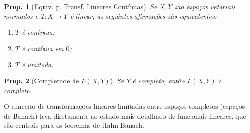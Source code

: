 \documentclass[11pt]{article}
\theoremstyle{yellowhead}
\newtheorem*{proposition}{Prop.}
\theoremstyle{yellowdef}
\begin{document}
\begin{multicols}{3}
\begin{proposition}[Equiv. p. Transf. Lineares Contínuas]
Se $X, Y$ são espaços vetoriais normados e $T: X \to Y$ é linear, as seguintes afirmações são equivalentes:
\begin{enumerate}[label=(\alph*)]
    \item $T$ é contínua;
    \item $T$ é contínua em $0$;
    \item $T$ é limitada.
\end{enumerate}
\end{proposition}

\begin{proposition}[Completude de $L(X, Y)$]
Se $Y$ é completo, então $L(X, Y)$ é completo.
\end{proposition}
O conceito de transformações lineares limitadas entre espaços completos (espaços de Banach) leva diretamente ao estudo mais detalhado de funcionais lineares, que são centrais para os teoremas de Hahn-Banach.
\end{multicols}
\end{document}
